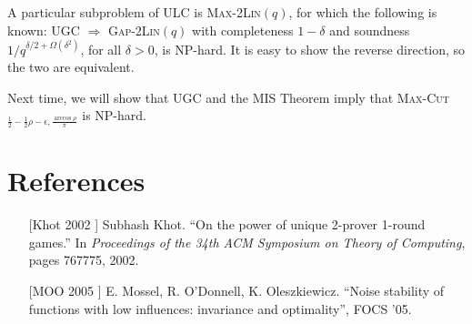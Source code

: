 \documentclass[12pt]{article}
\begin{document}
\begin{remark}
A particular subproblem of ULC is \textsc{Max-2Lin}$(q)$, for which the
following is known: UGC $\Rightarrow$ \textsc{Gap-2Lin}$(q)$ with
completeness $1-\delta$ and soundness $1 / q^{\delta/2 + \Omega(\delta^2)}$,
for all $\delta > 0$, is NP-hard. It is easy to show the reverse direction,
so the two are equivalent.
\end{remark}

Next time, we will show that UGC and the MIS Theorem imply that
\textsc{Max-Cut}$_{\frac{1}{2}-\frac{1}{2}\rho - \epsilon, \frac{\arccos{\rho}}{\pi}}$ is NP-hard.

\section{References}

\begin{itemize}

\item
[[Khot 2002]] Subhash Khot. ``On the power of unique 2-prover 1-round games.''
In \textit{Proceedings of the
34th ACM Symposium on Theory of Computing}, pages 767775, 2002.

\item
[[MOO 2005]] E. Mossel, R. O'Donnell, K. Oleszkiewicz.
``Noise stability of functions with low influences: invariance and optimality'',
FOCS '05.

\end{itemize}
\end{document}
